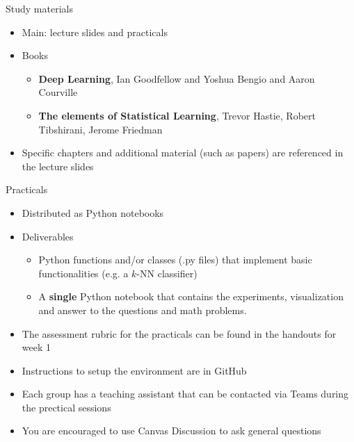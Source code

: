 \documentclass[notes]{beamer}          %
\begin{document}
\begin{frame}{Study materials}
\begin{itemize}
\item Main: lecture slides and practicals
\item Books
\begin{itemize}
    \item \textbf{Deep Learning}, Ian Goodfellow and Yoshua Bengio and Aaron Courville
    \item \textbf{The elements of Statistical Learning}, Trevor Hastie, Robert Tibshirani, Jerome Friedman
\end{itemize}
\item Specific chapters and additional material (such as papers) are referenced in the lecture slides
\end{itemize}
\end{frame}

\begin{frame}{Practicals}
\begin{itemize}
    \item Distributed as Python notebooks
    \item Deliverables
    \begin{itemize}
        \item Python functions and/or classes (.py files) that implement basic functionalities (e.g. a $k$-NN classifier)
        \item A \textbf{single} Python notebook that contains the experiments, visualization and answer to the questions and math problems.
    \end{itemize}
    \item The assessment rubric for the practicals can be found in the handouts for week 1
    \item Instructions to setup the environment are in GitHub
    \item Each group has a teaching assistant that can be contacted via Teams during the prectical sessions
    	\item You are encouraged to use Canvas Discussion to ask general questions
\end{itemize}    
\end{frame}
\end{document}
